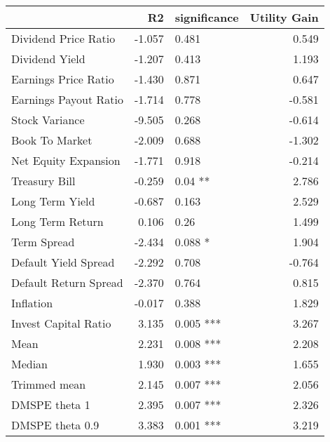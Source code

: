 \begin{tabular}{lrlr}
\toprule
{} &     R2 & significance &  Utility Gain \\
\midrule
Dividend Price Ratio  & -1.057 &       0.481  &         0.549 \\
Dividend Yield        & -1.207 &       0.413  &         1.193 \\
Earnings Price Ratio  & -1.430 &       0.871  &         0.647 \\
Earnings Payout Ratio & -1.714 &       0.778  &        -0.581 \\
Stock Variance        & -9.505 &       0.268  &        -0.614 \\
Book To Market        & -2.009 &       0.688  &        -1.302 \\
Net Equity Expansion  & -1.771 &       0.918  &        -0.214 \\
Treasury Bill         & -0.259 &      0.04 ** &         2.786 \\
Long Term Yield       & -0.687 &       0.163  &         2.529 \\
Long Term Return      &  0.106 &        0.26  &         1.499 \\
Term Spread           & -2.434 &      0.088 * &         1.904 \\
Default Yield Spread  & -2.292 &       0.708  &        -0.764 \\
Default Return Spread & -2.370 &       0.764  &         0.815 \\
Inflation             & -0.017 &       0.388  &         1.829 \\
Invest Capital Ratio  &  3.135 &    0.005 *** &         3.267 \\
Mean                  &  2.231 &    0.008 *** &         2.208 \\
Median                &  1.930 &    0.003 *** &         1.655 \\
Trimmed mean          &  2.145 &    0.007 *** &         2.056 \\
DMSPE theta 1         &  2.395 &    0.007 *** &         2.326 \\
DMSPE theta 0.9       &  3.383 &    0.001 *** &         3.219 \\
\bottomrule
\end{tabular}
